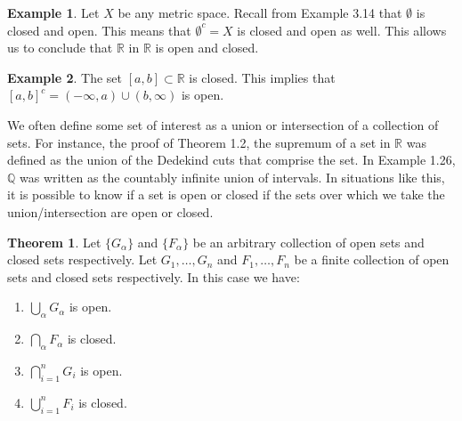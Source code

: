 \documentclass{article}
\newcommand{\R}{\mathbb{R}}
\newcommand{\Q}{\mathbb{Q}}
\theoremstyle{definition}
\newtheorem{theorem}{Theorem}[section]
\newtheorem{example}{Example}[section]
\begin{document}
\begin{example}
Let $ X $ be any metric space. Recall from Example 3.14 that $ \emptyset $ is closed and open. This means that $ \emptyset^c=X $ is closed and open as well. This allows us to conclude that $ \R $ in $ \R $ is open and closed.
\end{example}
\begin{example}
	The set $ [a,b]\subset \R $ is closed. This implies that $ [a,b]^c=(-\infty,a)\cup(b,\infty) $ is open.
\end{example}
We often define some set of interest as a union or intersection of a collection of sets. For instance, the proof of Theorem 1.2, the supremum of a set in $ \R $ was defined as the union of the Dedekind cuts that comprise the set. In Example 1.26, $ \Q $ was written as the countably infinite union of intervals. In situations like this, it is possible to know if a set is open or closed if the sets over which we take the union/intersection are open or closed. 
\begin{theorem}
	Let $ \{G_\alpha\} $ and $ \{F_\alpha\} $ be an arbitrary collection of open sets and closed sets respectively. Let $ G_1,\ldots,G_n $ and $ F_1,\ldots, F_n $ be a finite collection of open sets and closed sets respectively. In this case we have:
	\begin{enumerate}
		\item $ \bigcup_\alpha G_\alpha $ is open.
		\item $ \bigcap_\alpha F_\alpha $ is closed.
		\item $ \bigcap_{i=1}^n G_i$ is open.
		\item $ \bigcup_{i=1}^n F_i$ is closed.
	\end{enumerate}

\end{theorem}
\end{document}
